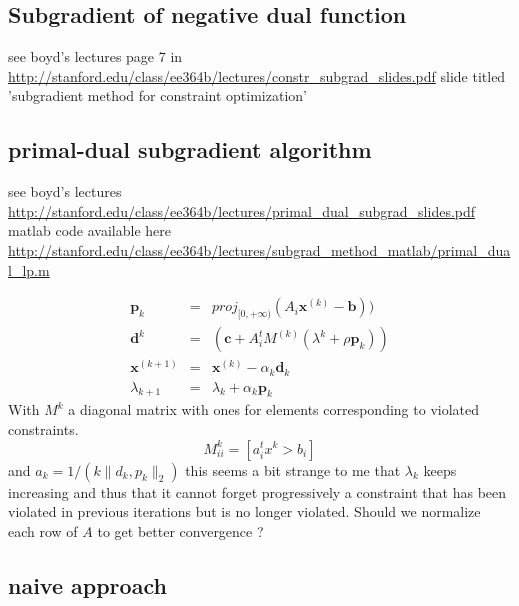 \documentclass[11pt]{article}
\begin{document}
\subsection{Subgradient of negative dual function}

see boyd's lectures page 7 in \url{http://stanford.edu/class/ee364b/lectures/constr_subgrad_slides.pdf}
slide titled 'subgradient method for constraint optimization'



\subsection{ primal-dual subgradient algorithm}
\label{primal-dual_subgradient}
see boyd's lectures \url{http://stanford.edu/class/ee364b/lectures/primal_dual_subgrad_slides.pdf}
matlab code available here \url{http://stanford.edu/class/ee364b/lectures/subgrad_method_matlab/primal_dual_lp.m}

\begin{eqnarray}
\mathbf{p}_k&=&proj_{[0,+\infty)}(A_i\mathbf{x}^{(k)}-\mathbf{b}))\\
\mathbf{d}^k&=&(\mathbf{c}+A_i^tM^{(k)}(\lambda^{k}+\rho \mathbf{p}_k))\\
\mathbf{x}^{(k+1)}&=&\mathbf{x}^{(k)}-\alpha_k \mathbf{d}_k\\
\lambda_{k+1}&=&\lambda_k+\alpha_k \mathbf{p}_k
\end{eqnarray}
With $M^{k}$ a diagonal matrix with ones for elements corresponding to violated constraints.
\begin{equation}
M_{ii}^k=[a_i^tx^{k}>b_i]
\end{equation}
and $a_k=1/(k\|d_k,p_k\|_2)$
this seems a bit strange to me that $\lambda_k$ keeps increasing and thus that it cannot forget progressively a constraint that has been violated in previous iterations but is no longer violated.
Should we normalize each row of $A$ to get better convergence ? 

\subsection{naive approach}
\end{document}
